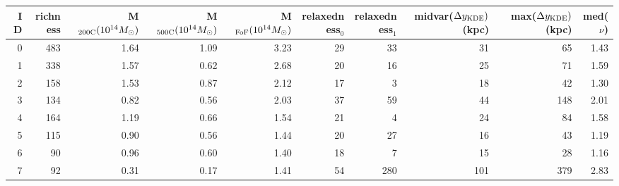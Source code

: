 \begin{tabular}{rrrrrrrrrr}
\toprule
ID & richness & M$_{\rm 200C} (10^{14} M_\odot)$ & M$_{\rm 500C} (10^{14} M_\odot)$ & M$_{\rm FoF} (10^{14} M_\odot)$  & relaxedness$_0$ & relaxedness$_1$ & midvar($\Delta y_{\rm KDE})$ (kpc) & max($\Delta y_{\rm KDE})$ (kpc) & med($\nu$) \\
\midrule
 0 &      483 &                             1.64 &                             1.09 &                             3.23 &              29 &              33 &                                 31 &                              65 &       1.43 \\
 1 &      338 &                             1.57 &                             0.62 &                             2.68 &              20 &              16 &                                 25 &                              71 &       1.59 \\
 2 &      158 &                             1.53 &                             0.87 &                             2.12 &              17 &               3 &                                 18 &                              42 &       1.30 \\
 3 &      134 &                             0.82 &                             0.56 &                             2.03 &              37 &              59 &                                 44 &                             148 &       2.01 \\
 4 &      164 &                             1.19 &                             0.66 &                             1.54 &              21 &               4 &                                 24 &                              84 &       1.58 \\
 5 &      115 &                             0.90 &                             0.56 &                             1.44 &              20 &              27 &                                 16 &                              43 &       1.19 \\
 6 &       90 &                             0.96 &                             0.60 &                             1.40 &              18 &               7 &                                 15 &                              28 &       1.16 \\
 7 &       92 &                             0.31 &                             0.17 &                             1.41 &              54 &             280 &                                101 &                             379 &       2.83 \\

\end{tabular}
